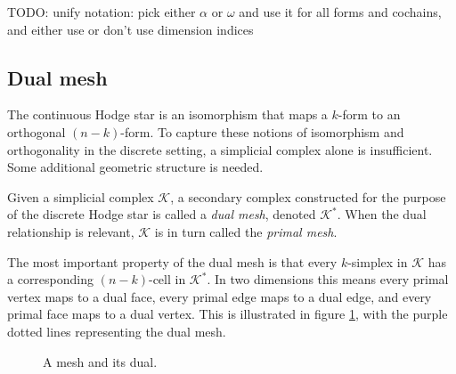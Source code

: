 \documentclass[utf8,english]{gradu3}
\begin{document}
TODO: unify notation: pick either $\alpha$ or $\omega$
and use it for all forms and cochains,
and either use or don't use dimension indices

\subsection{Dual mesh}\label{sec:dual_mesh}

The continuous Hodge star is an isomorphism
that maps a $k$-form to an orthogonal $(n-k)$-form.
To capture these notions of isomorphism and orthogonality
in the discrete setting, a simplicial complex alone is insufficient.
Some additional geometric structure is needed.

Given a simplicial complex $\mathcal{K}$,
a secondary complex constructed for the purpose of the discrete Hodge star
is called a \textit{dual mesh}, denoted $\mathcal{K}^*$.
When the dual relationship is relevant,
$\mathcal{K}$ is in turn called the \textit{primal mesh}.

The most important property of the dual mesh
is that every $k$-simplex in $\mathcal{K}$
has a corresponding $(n-k)$-cell in $\mathcal{K}^*$.
In two dimensions this means every primal vertex maps to a dual face,
every primal edge maps to a dual edge, and every primal face maps to a dual vertex.
This is illustrated in figure \ref{fig:dual_mesh},
with the purple dotted lines representing the dual mesh.

\begin{figure}[h]
  \centering
  \caption{A mesh and its dual.}
  \label{fig:dual_mesh}
\end{figure}
\end{document}
